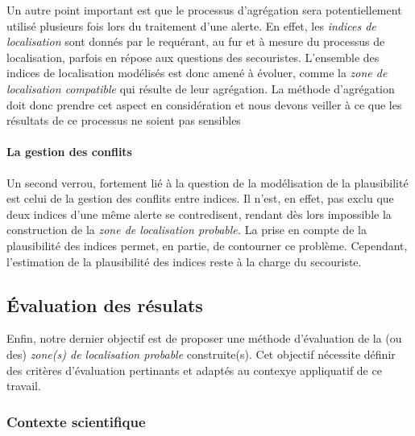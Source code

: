 
Un autre point important est que le processus d'agrégation sera
potentiellement utilisé plusieurs fois lors du traitement d'une
alerte. En effet, les \emph{indices de localisation} sont donnés par
le requérant, au fur et à mesure du processus de localisation, parfois
en répose aux questions des secouristes. L'ensemble des indices de
localisation modélisés est donc amené à évoluer, comme la \emph{zone
  de localisation compatible} qui résulte de leur agrégation. La
méthode d’agrégation doit donc prendre cet aspect en considération et
nous devons veiller à ce que les résultats de ce processus ne soient
pas sensibles


\paragraph{La gestion des conflits}


Un second verrou, fortement lié à la question de la modélisation de la
plausibilité est celui de la gestion des conflits entre indices. Il
n'est, en effet, pas exclu que deux indices d'une même alerte se
contredisent, rendant dès lors impossible la construction de la
\emph{zone de localisation probable.} La prise en compte de la
plausibilité des indices permet, en partie, de contourner ce
problème. Cependant, l'estimation de la plausibilité des indices reste
à la charge du secouriste.



\subsection{Évaluation des résulats}
\label{subsec:2-1-5}

Enfin, notre dernier objectif est de proposer une méthode d'évaluation
de la (ou des) \emph{zone(s) de localisation probable}  construite(s). Cet
objectif nécessite définir des critères d'évaluation pertinants et
adaptés au contexye appliquatif de ce travail.

\subsubsection{Contexte scientifique}


